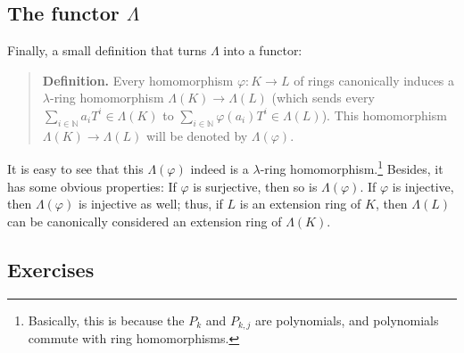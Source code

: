 \documentclass[numbers=enddot,12pt,final,onecolumn,notitlepage]{scrartcl}%
\begin{document}
\subsection{The functor $\Lambda$}

Finally, a small definition that turns $\Lambda$ into a functor:

\begin{quote}
\textbf{Definition.} Every homomorphism $\varphi:K\rightarrow L$ of rings
canonically induces a $\lambda$-ring homomorphism $\Lambda\left(  K\right)
\rightarrow\Lambda\left(  L\right)  $ (which sends every $\sum\limits_{i\in
\mathbb{N}}a_{i}T^{i}\in\Lambda\left(  K\right)  $ to $\sum\limits_{i\in
\mathbb{N}}\varphi\left(  a_{i}\right)  T^{i}\in\Lambda\left(  L\right)  $).
This homomorphism $\Lambda\left(  K\right)  \rightarrow\Lambda\left(
L\right)  $ will be denoted by $\Lambda\left(  \varphi\right)  $.
\end{quote}

It is easy to see that this $\Lambda\left(  \varphi\right)  $ indeed is a
$\lambda$-ring homomorphism.\footnote{Basically, this is because the $P_{k}$
and $P_{k,j}$ are polynomials, and polynomials commute with ring
homomorphisms.} Besides, it has some obvious properties: If $\varphi$ is
surjective, then so is $\Lambda\left(  \varphi\right)  $. If $\varphi$ is
injective, then $\Lambda\left(  \varphi\right)  $ is injective as well; thus,
if $L$ is an extension ring of $K$, then $\Lambda\left(  L\right)  $ can be
canonically considered an extension ring of $\Lambda\left(  K\right)  $.

\subsection{Exercises}
\end{document}
